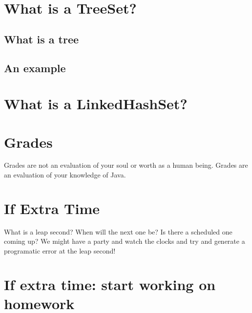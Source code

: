\documentclass[12pt]{article}
\begin{document}
\section{What is a TreeSet?}
\subsection{What is a tree}
\subsection{An example}


\section{What is a LinkedHashSet?}

\section{Grades}
Grades are not an evaluation of your soul or worth as a human being. Grades are an evaluation of your knowledge of Java. 

\section{If Extra Time}
What is a leap second? When will the next one be? Is there a scheduled one coming up? We might have a party and watch the clocks and try and generate a programatic error at the leap second!

\section{If extra time: start working on homework}
\end{document}

